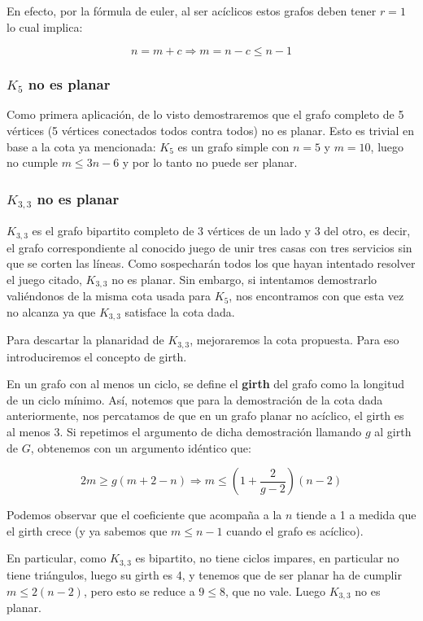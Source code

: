 \documentclass{article}
\begin{document}
En efecto, por la fórmula de euler, al ser acíclicos estos grafos deben tener $r = 1$ lo cual implica:

$$n = m + c \Rightarrow m = n - c \leq n - 1$$

\subsubsection{$K_5$ no es planar}

Como primera aplicación, de lo visto demostraremos que el grafo completo de 5 vértices (5 vértices conectados todos contra todos) no es planar.
Esto es trivial en base a la cota ya mencionada: $K_5$ es un grafo simple con $n = 5$ y $m = 10$, luego no cumple $m \leq 3n - 6$ y por lo
tanto no puede ser planar.

\subsubsection{$K_{3,3}$ no es planar}

$K_{3,3}$ es el grafo bipartito completo de 3 vértices de un lado y 3 del otro, es decir, el grafo correspondiente al conocido juego de
unir tres casas con tres servicios sin que se corten las líneas. Como sospecharán todos los que hayan intentado resolver el juego citado,
$K_{3,3}$ no es planar. Sin embargo, si intentamos demostrarlo valiéndonos de la misma cota usada para $K_5$, nos encontramos con que esta
vez no alcanza ya que $K_{3,3}$ satisface la cota dada.

Para descartar la planaridad de $K_{3,3}$, mejoraremos la cota propuesta. Para eso introduciremos el concepto de girth.

En un grafo con al menos un ciclo, se define el \textbf{girth} del grafo como la longitud de un ciclo mínimo. Así, notemos que para
la demostración de la cota dada anteriormente, nos percatamos de que en un grafo planar no acíclico, el girth es al menos 3. Si repetimos
el argumento de dicha demostración llamando $g$ al girth de $G$, obtenemos con un argumento idéntico que:

$$2m \geq g(m + 2 - n) \Rightarrow m \leq \left ( 1 + \frac{2}{g-2} \right )(n-2)$$

Podemos observar que el coeficiente que acompaña a la $n$ tiende a 1 a medida que el girth crece (y ya sabemos que $m \leq n-1$ cuando el
grafo es acíclico).

En particular, como $K_{3,3}$ es bipartito, no tiene ciclos impares, en particular no tiene triángulos, luego su girth es 4, y tenemos
que de ser planar ha de cumplir $m \leq 2(n-2)$, pero esto se reduce a $9 \leq 8$, que no vale. Luego $K_{3,3}$ no es planar.
\end{document}

